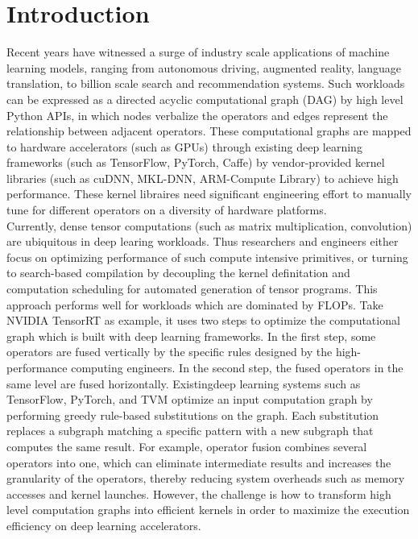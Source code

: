 
\section{Introduction}

Recent years have witnessed a surge of industry scale applications of machine learning models, ranging from autonomous driving, augmented 
reality, language translation, to billion scale search and recommendation systems. Such workloads can be expressed as a directed acyclic 
computational graph (DAG) by high level Python APIs, in which nodes verbalize the operators and edges represent the relationship between
adjacent operators. These computational graphs are mapped to hardware accelerators (such as GPUs) through existing deep learning frameworks
(such as TensorFlow, PyTorch, Caffe) by vendor-provided kernel libraries (such as cuDNN, MKL-DNN, ARM-Compute Library) to achieve high
performance. These kernel libraires need significant engineering effort to manually tune for different operators on a diversity
of hardware platforms. \\

Currently, dense tensor computations (such as matrix multiplication, convolution) are ubiquitous in deep learing workloads. Thus researchers
and engineers either focus on optimizing performance of such compute intensive primitives, or turning to search-based compilation by decoupling the kernel definitation and computation scheduling for automated generation of tensor programs. This approach performs well for workloads which 
are dominated by FLOPs. Take NVIDIA TensorRT as example, it uses two steps to optimize the computational graph which is built with deep learning 
frameworks. In the first step, some operators are fused vertically by the specific rules designed by the high-performance computing engineers. In the second step, the fused operators in the same level are fused horizontally. Existingdeep learning systems such as TensorFlow, PyTorch, and
TVM optimize an input computation graph by performing greedy rule-based substitutions on the graph. Each substitution
replaces a subgraph matching a specific pattern with a new subgraph that computes the same result. For example, operator fusion combines several operators into one, which can eliminate intermediate results and increases the granularity of the operators, thereby reducing system overheads such as memory accesses and kernel launches. However, the challenge is how to transform high level computation graphs into efficient kernels in
order to maximize the execution efficiency on deep learning accelerators. \\


